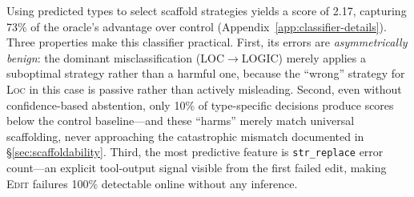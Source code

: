 \documentclass[11pt]{article}
\begin{document}
Using predicted types to select scaffold strategies yields a score of 2.17, capturing 73\% of the oracle's advantage over control (Appendix~\ref{app:classifier-details}).
Three properties make this classifier practical.
First, its errors are \textit{asymmetrically benign}: the dominant misclassification (LOC$\to$LOGIC) merely applies a suboptimal strategy rather than a harmful one, because the ``wrong'' strategy for \textsc{Loc} in this case is passive rather than actively misleading.
Second, even without confidence-based abstention, only 10\% of type-specific decisions produce scores below the control baseline---and these ``harms'' merely match universal scaffolding, never approaching the catastrophic mismatch documented in \S\ref{sec:scaffoldability}.
Third, the most predictive feature is \texttt{str\_replace} error count---an explicit tool-output signal visible from the first failed edit, making \textsc{Edit} failures 100\% detectable online without any inference.
\end{document}

